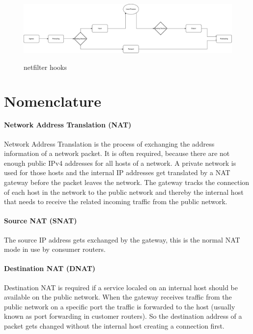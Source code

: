 \documentclass{report}
\begin{document}
\begin{figure}[ht]
	\centering
	\includegraphics[width=\textwidth]{../Hooks.pdf}
	\label{Hooks.pdf}
	\caption{netfilter hooks}  
\end{figure}

\section{Nomenclature}\label{nomenclature}

\paragraph{Network Address Translation (NAT)}

Network Address Translation is the process of exchanging the address
information of a network packet. It is often required, because there are
not enough public IPv4 addresses for all hosts of a network. A private
network is used for those hosts and the internal IP addresses get
translated by a NAT gateway before the packet leaves the network. The
gateway tracks the connection of each host in the network to the public
network and thereby the internal host that needs to receive the related
incoming traffic from the public network.

\paragraph{Source NAT (SNAT)}

The source IP address gets exchanged by the gateway, this is the normal
NAT mode in use by consumer routers.

\paragraph{Destination NAT (DNAT)}

Destination NAT is required if a service localed on an internal host should be available on
the public network. When the gateway receives traffic from the public
network on a specific port the traffic is forwarded to the host (usually
known as port forwarding in customer routers). So the destination
address of a packet gets changed without the internal host creating a
connection first.
\end{document}
